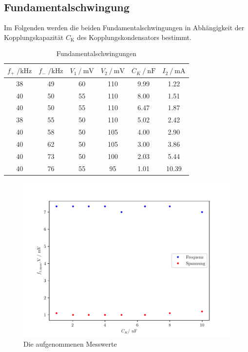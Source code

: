 \subsection{Fundamentalschwingung}
Im Folgenden werden die beiden Fundamentalschwingungen in Abhängigkeit der Kopplungskapazität $C_{\text{K}}$ des Kopplungskondensators
bestimmt. 


\begin{table}
  \centering
  \caption{Fundamentalschwingungen}
  \label{tab:aufgabeC}
  \begin{tabular}{c c c c c c}
      \toprule
      {$f_+\;/ \si{\kilo\hertz}$} & {$f_-\;/ \si{\kilo\hertz}$} & {$V_1 \:/\: \si{\milli\volt}$} & {$V_2 \:/\: \si{\milli\volt}$} & {$C_K \:/\: \si{\nano\farad}$} & $I_2 \:/\:\si{\milli\ampere}$ \\
      \midrule
      38 & 49 & 60 & 110 & 9.99 & 1.22 \\
      40 & 50 & 55 & 110 & 8.00 & 1.51 \\
      40 & 50 & 55 & 110 & 6.47 & 1.87 \\
      38 & 55 & 50 & 110 & 5.02 & 2.42 \\
      40 & 58 & 50 & 105 & 4.00 & 2.90 \\
      40 & 62 & 50 & 105 & 3.00 & 3.86 \\
      40 & 73 & 50 & 100 & 2.03 & 5.44 \\
      40 & 76 & 55 & 95 & 1.01 & 10.39 \\
      \bottomrule
  \end{tabular}
\end{table}


\begin{figure}
  \centering
  \includegraphics{freq1.pdf}
  \caption{Die aufgenommenen Messwerte}
  \label{fig:freq1}
\end{figure}

